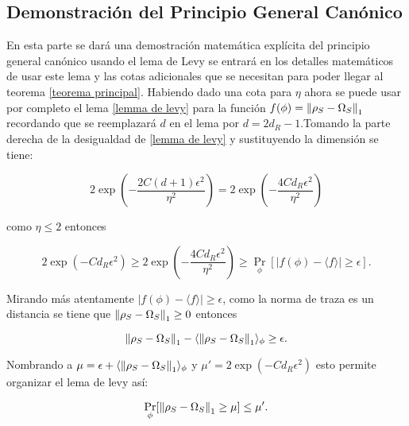 \subsection{Demonstración del Principio General Canónico}
En esta parte se dará una demostración matemática explícita del principio general canónico usando el lema de Levy se entrará en los detalles matemáticos de usar este lema y las cotas adicionales que se necesitan para poder llegar al teorema \ref{teorema principal}. Habiendo dado una cota para $\eta$ ahora se puede usar por completo el lema \ref{lemma de levy} para la función $f(\phi)=\norm{\rho_{S} -\Omega_{S}}_{1}$ recordando que se reemplazará $d$ en el lema por $d=2d_{R}-1$.Tomando la parte derecha de la desigualdad de \ref{lemma de levy}  y sustituyendo la dimensión se tiene:

\begin{equation}
 2 \exp(-\frac{2C(d+1)\epsilon^2}{\eta^2})= 2 \exp(-\frac{4Cd_{R}\epsilon^2}{\eta^2})
\end{equation}

como $\eta \le 2$ entonces

\begin{equation} \label{desigualdad}
2\exp(-Cd_{R}\epsilon^2) \ge 2 \exp(-\frac{4Cd_{R}\epsilon^2}{\eta^2}) \ge \Pr_{\phi}[|f(\phi)- \langle f \rangle| \ge \epsilon ].
\end{equation}

Mirando más atentamente  $|f(\phi)- \langle f \rangle| \ge \epsilon $, como la norma de traza es un distancia se tiene que  $\norm{\rho_{S} -\Omega_{S}}_{1} \ge 0$ entonces


\begin{equation}
\norm{\rho_{S} -\Omega_{S}}_{1}- \langle \norm{\rho_{S} -\Omega_{S}}_{1} \rangle_{\phi} \ge \epsilon.
\end{equation}

Nombrando a $\mu = \epsilon + \langle \norm{\rho_{S} -\Omega_{S}}_{1} \rangle_{\phi} $ y $\mu'=2 \exp(-Cd_{R}\epsilon^2)$ esto permite organizar el lema de levy así:

\begin{equation} \label{eq.3}
\Pr_{\phi}[\norm{\rho_{S} -\Omega_{S}}_{1} \ge \mu] \le \mu'.
\end{equation}

